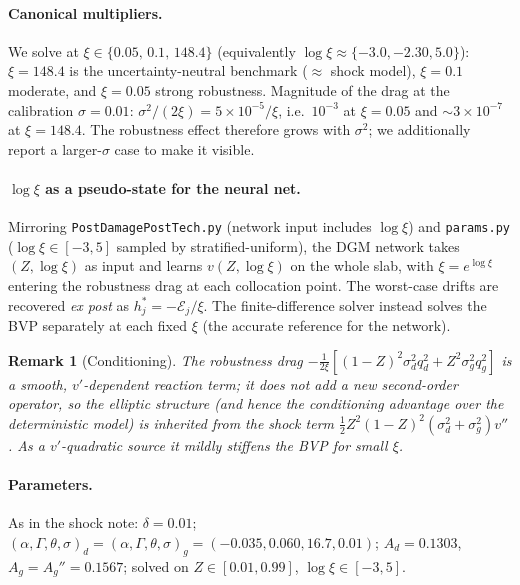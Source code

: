 \documentclass[11pt]{article}
\newtheorem{remark}{Remark}
\newcommand{\xicap}{\xi}
\begin{document}
\paragraph{Canonical multipliers.} We solve at $\xicap\in\{0.05,\,0.1,\,148.4\}$
(equivalently $\log\xicap\approx\{-3.0,-2.30,5.0\}$): $\xicap=148.4$ is the
uncertainty-neutral benchmark ($\approx$ shock model), $\xicap=0.1$ moderate, and
$\xicap=0.05$ strong robustness. Magnitude of the drag at the calibration
$\sigma=0.01$: $\sigma^2/(2\xicap)=5\!\times\!10^{-5}/\xicap$, i.e.\ $10^{-3}$ at
$\xicap=0.05$ and $\sim\!3\!\times\!10^{-7}$ at $\xicap=148.4$. The robustness effect
therefore grows with $\sigma^2$; we additionally report a larger-$\sigma$ case to make
it visible.

\paragraph{$\log\xicap$ as a pseudo-state for the neural net.} Mirroring
\texttt{PostDamagePostTech.py} (network input includes $\log\xicap$) and
\texttt{params.py} ($\log\xicap\in[-3,5]$ sampled by stratified-uniform), the DGM
network takes $(Z,\log\xicap)$ as input and learns $v(Z,\log\xicap)$ on the whole
slab, with $\xicap=e^{\log\xicap}$ entering the robustness drag at each collocation
point. The worst-case drifts are recovered \emph{ex post} as
$h_j^\ast=-\mathcal E_j/\xicap$. The finite-difference solver instead solves the BVP
separately at each fixed $\xicap$ (the accurate reference for the network).

\begin{remark}[Conditioning]
The robustness drag $-\tfrac1{2\xicap}[(1-Z)^2\sigma_d^2q_d^2+Z^2\sigma_g^2q_g^2]$ is
a smooth, $v'$-dependent reaction term; it does not add a new second-order operator,
so the elliptic structure (and hence the conditioning advantage over the deterministic
model) is inherited from the shock term $\tfrac12Z^2(1-Z)^2(\sigma_d^2+\sigma_g^2)v''$.
As a $v'$-quadratic source it mildly stiffens the BVP for small $\xicap$.
\end{remark}

\paragraph{Parameters.} As in the shock note: $\delta=0.01$;
$(\alpha,\Gamma,\theta,\sigma)_d=(\alpha,\Gamma,\theta,\sigma)_g=(-0.035,0.060,16.7,0.01)$;
$A_d=0.1303$, $A_g=A_g''=0.1567$; solved on $Z\in[0.01,0.99]$,
$\log\xicap\in[-3,5]$.
\end{document}
